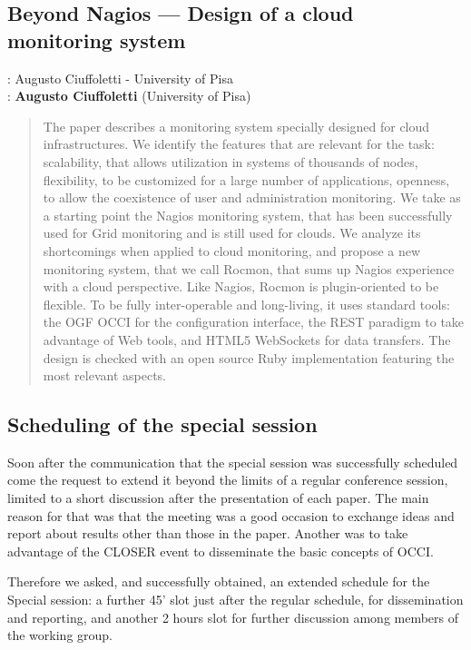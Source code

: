 \documentclass[10pt,a4paper]{article}
\begin{document}
\subsection*{Beyond Nagios --- Design of a cloud monitoring system \cite{ciu16a}}

: Augusto Ciuffoletti - University of Pisa\\
: {\bf Augusto Ciuffoletti} (University of Pisa)

\begin{quote}
	The paper describes a monitoring system specially designed for cloud infrastructures. We identify the features
	that are relevant for the task: scalability, that allows utilization in systems of thousands of nodes, flexibility, to
	be customized for a large number of applications, openness, to allow the coexistence of user and administration
	monitoring. We take as a starting point the Nagios monitoring system, that has been successfully used for
	Grid monitoring and is still used for clouds. We analyze its shortcomings when applied to cloud monitoring,
	and propose a new monitoring system, that we call Rocmon, that sums up Nagios experience with a cloud
	perspective. Like Nagios, Rocmon is plugin-oriented to be flexible. To be fully inter-operable and long-living,
	it uses standard tools: the OGF OCCI for the configuration interface, the REST paradigm to take advantage
	of Web tools, and HTML5 WebSockets for data transfers. The design is checked with an open source Ruby
	implementation featuring the most relevant aspects.
\end{quote}


\subsection*{Scheduling of the special session}

Soon after the communication that the special session was successfully scheduled come the request to extend it beyond the limits of a regular conference session, limited to a short discussion after the presentation of each paper. The main reason for that was that the meeting was a good occasion to exchange ideas and report about results other than those in the paper. Another was to take advantage of the CLOSER event to disseminate the basic concepts of OCCI.

Therefore we asked, and successfully obtained, an extended schedule for the Special session: a further 45' slot just after the regular schedule, for dissemination and reporting, and another 2 hours slot for further discussion among members of the working group.
\end{document}
